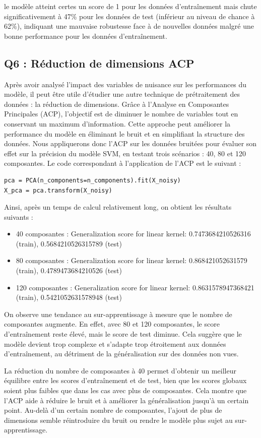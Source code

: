 \documentclass{scrartcl}
\begin{document}
le modèle atteint certes un score de 1 pour les données d'entraînement mais chute significativement à 47\% pour les données de test (inférieur au niveau de chance à 62\%), indiquant une mauvaise robustesse face à de nouvelles données malgré une bonne performance pour les données d'entraînement.

\subsection{Q6 : Réduction de dimensions ACP}
\hspace{7pt} Après avoir analysé l'impact des variables de nuisance sur les performances du modèle, il peut être utile d'étudier une autre technique de prétraitement des données : la réduction de dimensions. Grâce à l'Analyse en Composantes Principales (ACP), l'objectif est de diminuer le nombre de variables tout en conservant un maximum d'information. Cette approche peut améliorer la performance du modèle en éliminant le bruit et en simplifiant la structure des données. Nous appliquerons donc l'ACP sur les données bruitées pour évaluer son effet sur la précision du modèle SVM, en testant trois scénarios : 40, 80 et 120 composantes. Le code correspondant à l'application de l'ACP est le suivant :
\begin{lstlisting}
pca = PCA(n_components=n_components).fit(X_noisy)
X_pca = pca.transform(X_noisy)
\end{lstlisting}

Ainsi, après un temps de calcul relativement long, on obtient les résultats suivants :
\begin{itemize}
    \item 40 composantes : Generalization score for linear kernel: 0.7473684210526316 (train), 0.5684210526315789 (test) 
    \item 80 composantes : Generalization score for linear kernel: 0.868421052631579 (train), 0.4789473684210526 (test) 
    \item 120 composantes : Generalization score for linear kernel: 0.8631578947368421 (train), 0.5421052631578948 (test) 
\end{itemize}

On observe une tendance au sur-apprentissage à mesure que le nombre de composantes augmente. En effet, avec 80 et 120 composantes, le score d'entraînement reste élevé, mais le score de test diminue. Cela suggère que le modèle devient trop complexe et s'adapte trop étroitement aux données d'entraînement, au détriment de la généralisation sur des données non vues.
\newline

La réduction du nombre de composantes à 40 permet d'obtenir un meilleur équilibre entre les scores d'entraînement et de test, bien que les scores globaux soient plus faibles que dans les cas avec plus de composantes. Cela montre que l'ACP aide à réduire le bruit et à améliorer la généralisation jusqu'à un certain point. Au-delà d'un certain nombre de composantes, l'ajout de plus de dimensions semble réintroduire du bruit ou rendre le modèle plus sujet au sur-apprentissage.
\end{document}
